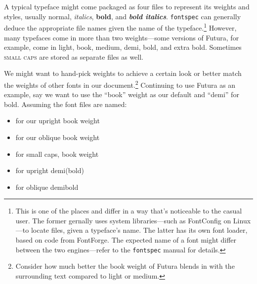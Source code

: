 A typical typeface might come packaged as four files to represent its
weights and styles, usually
normal,
\textit{italics},
\textbf{bold}, and
\textit{\textbf{bold italics}}.
\texttt{fontspec} can generally deduce the appropriate file
names given the name of the typeface.\punckern\footnote{This is
one of the places \XeLaTeX{} and \LuaLaTeX{}
differ in a way that's noticeable to the casual user.
The former gernally uses system libraries---such as FontConfig on Linux---to
locate files, given a typeface's name.
The latter has its own font loader,
based on code from FontForge.\punckern{}
The expected name of a font might differ between the two engines---refer
to the \texttt{fontspec} manual for details.}
However, many typefaces come in more than two weights---some versions of Futura,
for example, come in
{light},
{book},
{medium},
{demi},
{bold}, and
{extra bold}.
Sometimes
{\textsc{small caps}}
are stored as separate files as well.

We might want to hand-pick weights to achieve a certain look or better match the
weights of other fonts in our document.\punckern\footnote{Consider how much
better {the book weight} of Futura
blends in with the surrounding text compared to
{light}
or
{medium}.}
Continuing to use Futura as an example,
say we want to use the ``book'' weight as our default
and ``demi'' for bold.
Assuming the font files are named:
\begin{itemize}
\item {} for our
    {upright book weight}
\item {} for our
    {oblique book weight}
\item {} for
    {small caps, book weight}
\item {} for
    {upright demi(bold)}
\item {} for
    {oblique demibold}
\end{itemize}


